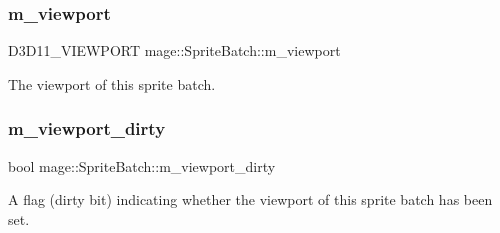 \hypertarget{classmage_1_1_sprite_batch_a3029ab1ee01ccfc69fef88eb78d5bfc0}{}\label{classmage_1_1_sprite_batch_a3029ab1ee01ccfc69fef88eb78d5bfc0} 
\subsubsection{\texorpdfstring{m\+\_\+viewport}{m\_viewport}}
{\footnotesize\ttfamily D3\+D11\+\_\+\+V\+I\+E\+W\+P\+O\+RT mage\+::\+Sprite\+Batch\+::m\+\_\+viewport\hspace{0.3cm}{\ttfamily [private]}}

The viewport of this sprite batch. \hypertarget{classmage_1_1_sprite_batch_a36c02637431746043ed6549c9b622550}{}\label{classmage_1_1_sprite_batch_a36c02637431746043ed6549c9b622550} 
\subsubsection{\texorpdfstring{m\+\_\+viewport\+\_\+dirty}{m\_viewport\_dirty}}
{\footnotesize\ttfamily bool mage\+::\+Sprite\+Batch\+::m\+\_\+viewport\+\_\+dirty\hspace{0.3cm}{\ttfamily [private]}}

A flag (dirty bit) indicating whether the viewport of this sprite batch has been set. 